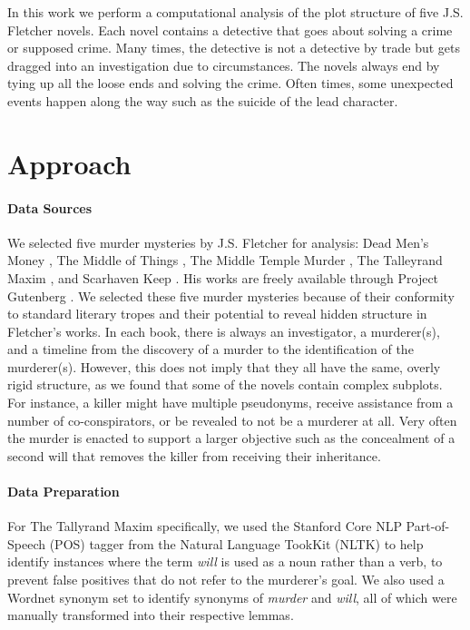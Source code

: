 \documentclass{article}
\begin{document}
In this work we perform a computational analysis of the plot structure of five J.S. Fletcher novels. Each novel contains a detective that goes about solving a crime or supposed crime. Many times, the detective is not a detective by trade but gets dragged into an investigation due to circumstances. The novels always end by tying up all the loose ends and solving the crime. Often times, some unexpected events happen along the way such as the suicide of the lead character. \\

\section{Approach}
\paragraph{Data Sources} We selected five murder mysteries by J.S. Fletcher for analysis: Dead Men's Money \cite{deadmen}, The Middle of Things \cite{middleofthings}, The Middle Temple Murder \cite{middletemplemurder}, The Talleyrand Maxim \cite{tallyrandmaxim}, and Scarhaven Keep \cite{scarhavenkeep}. His works are freely available through Project Gutenberg \cite{gutenberg}.  We selected these five murder mysteries because of their conformity to standard literary tropes and their potential to reveal hidden structure in Fletcher's works. In each book, there is always an investigator, a murderer(s), and a timeline from the discovery of a murder to the identification of the murderer(s). However, this does not imply that they all have the same, overly rigid structure, as we found that some of the novels contain complex subplots. For instance, a killer might have multiple pseudonyms, receive assistance from a number of co-conspirators, or be revealed to not be a murderer at all. Very often the murder is enacted to support a larger objective such as the concealment of a second will that removes the killer from receiving their inheritance.

\paragraph{Data Preparation} For The Tallyrand Maxim specifically, we used the Stanford Core NLP Part-of-Speech (POS) tagger from the Natural Language TookKit (NLTK) to help identify instances where the term \textit{will} is used as a noun rather than a verb, to prevent false positives that do not refer to the murderer's goal. We also used a Wordnet synonym set to identify synonyms of \textit{murder} and \textit{will}, all of which were manually transformed into their respective lemmas.
\end{document}
